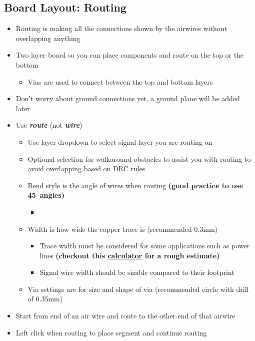 \documentclass{article}
\begin{document}
\subsection{Board Layout: Routing}
\begin{itemize}
    \item Routing is making all the connections shown by the airwires without overlapping anything
    \item Two layer board so you can place components and route on the top or the bottom
    \begin{itemize}
        \item Vias are used to connect between the top and bottom layers
    \end{itemize}
    \item Don't worry about ground connections yet, a ground plane will be added later
    \item Use \textit{\textbf{route}} (not \textit{\textbf{wire}})
    \begin{itemize}
        \item Use layer dropdown to select signal layer you are routing on
        \item Optional selection for walkaround obstacles to assist you with routing to avoid overlapping based on DRC rules
        \item Bend style is the angle of wires when routing \textbf{(good practice to use 45\degree\ angles)}
        \begin{itemize}
            \item 
        \end{itemize}
        \item Width is how wide the copper trace is (recommended 0.3mm)
        \begin{itemize}
            \item Trace width must be considered for some applications such as power lines \textbf{(checkout this \href{https://www.4pcb.com/trace-width-calculator.html}{calculator} for a rough estimate)}
            \item Signal wire width should be sizable compared to their footprint
        \end{itemize}
        \item Via settings are for size and shape of via (recommended circle with drill of 0.35mm)
    \end{itemize}
    \item Start from end of an air wire and route to the other end of that airwire
    \item Left click when routing to place segment and continue routing

\end{itemize}
\end{document}
